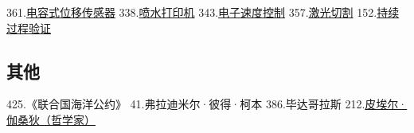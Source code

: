 361.\href{https://wuli.wiki/assets/sogou/361.\%E7\%94\%B5\%E5\%AE\%B9\%E5\%BC\%8F\%E4\%BD\%8D\%E7\%A7\%BB\%E4\%BC\%A0\%E6\%84\%9F\%E5\%99\%A8\%20-\%20\%E6\%90\%9C\%E7\%8B\%97\%E7\%A7\%91\%E5\%AD\%A6\%E7\%99\%BE\%E7\%A7\%91.html}{电容式位移传感器}
338.\href{https://wuli.wiki/assets/sogou/338.\%E5\%96\%B7\%E6\%B0\%B4\%E6\%89\%93\%E5\%8D\%B0\%E6\%9C\%BA\%20-\%20\%E6\%90\%9C\%E7\%8B\%97\%E7\%A7\%91\%E5\%AD\%A6\%E7\%99\%BE\%E7\%A7\%91.html}{喷水打印机}
343.\href{https://wuli.wiki/assets/sogou/343.\%E7\%94\%B5\%E5\%AD\%90\%E9\%80\%9F\%E5\%BA\%A6\%E6\%8E\%A7\%E5\%88\%B6\%20-\%20\%E6\%90\%9C\%E7\%8B\%97\%E7\%A7\%91\%E5\%AD\%A6\%E7\%99\%BE\%E7\%A7\%91.html}{电子速度控制}
357.\href{https://wuli.wiki/assets/sogou/357.\%E6\%BF\%80\%E5\%85\%89\%E5\%88\%87\%E5\%89\%B2\%20-\%20\%E6\%90\%9C\%E7\%8B\%97\%E7\%A7\%91\%E5\%AD\%A6\%E7\%99\%BE\%E7\%A7\%91.html}{激光切割}
152.\href{https://wuli.wiki/assets/sogou/152.\%E6\%8C\%81\%E7\%BB\%AD\%E8\%BF\%87\%E7\%A8\%8B\%E9\%AA\%8C\%E8\%AF\%81\%20-\%20\%E6\%90\%9C\%E7\%8B\%97\%E7\%A7\%91\%E5\%AD\%A6\%E7\%99\%BE\%E7\%A7\%91.html}{持续过程验证}

\subsection{其他}
425.《联合国海洋公约》
41.弗拉迪米尔·彼得·柯本
386.毕达哥拉斯
212.\href{https://wuli.wiki/assets/sogou/212.\%E7\%9A\%AE\%E5\%9F\%83\%E5\%B0\%94\%C2\%B7\%E4\%BC\%BD\%E6\%A1\%91\%E7\%8B\%84\%20-\%20\%E6\%90\%9C\%E7\%8B\%97\%E7\%A7\%91\%E5\%AD\%A6\%E7\%99\%BE\%E7\%A7\%91.html}{皮埃尔·伽桑狄（哲学家）}
